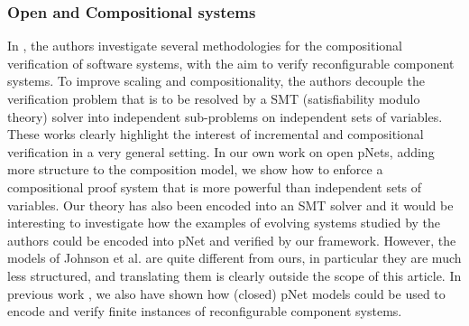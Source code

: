 \documentclass{elsarticle}
\newcommand{\TODO}[1]{\textcolor{red}{\textbf{[TODO:#1]}}}
\begin{document}

\subsubsection*{Open and Compositional systems}
In
\cite{Johnson:2013:CBSE,Johnson:2014:qosa}, the authors investigate several methodologies for the compositional verification of software systems, with the aim to verify reconfigurable component systems. To improve scaling and compositionality, the authors  decouple the verification problem that is to be resolved by a SMT (satisfiability modulo theory) solver into independent sub-problems on independent sets of variables. These works clearly highlight the interest of incremental and compositional verification in a very general setting. In our own work on open pNets, adding more structure to the composition model, we show how to enforce a compositional proof system that is more powerful than independent sets of variables. Our theory has also been encoded into an SMT solver and it would be interesting to investigate how the examples of evolving systems studied by the authors could be encoded into pNet and verified by our framework. However, the models of Johnson et al. are quite different from ours, in particular they are much less structured, and translating them is clearly outside the scope of this article.
In previous work \cite{gaspar:hal-00916115}, we also have shown how (closed) pNet models could be used to encode and verify finite instances of reconfigurable component systems. 

\end{document}
